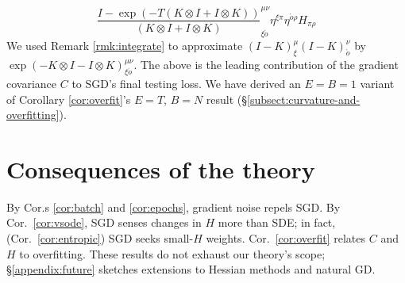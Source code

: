 \documentclass[anon,12pt]{colt2021} %
\newcommand{\wrap}[1]{\left(#1\right)}
\newcommand{\omicron}{{\acute{o}}}
\begin{document}
{$${                        \frac{
                            I-\exp\wrap{-T(K\otimes I + I\otimes K)}
                        }{
                            (K\otimes I + I\otimes K)
                        }
                    }^{\mu\nu}_{\xi\omicron}
                    \eta^{\xi\pi}
                    \eta^{\omicron\rho}
                H_{\pi\rho}
            $$
            We used Remark \ref{rmk:integrate} to approximate
            $(I-K)^\mu_\xi(I-K)^\nu_\omicron$ by $\exp(-K\otimes I - I\otimes K)^{\mu\nu}_{\xi\omicron}$.
            The above is the leading contribution of the gradient covariance $C$
            to SGD's final testing loss.  We have derived an $E=B=1$ variant of
            Corollary \ref{cor:overfit}'s 
            $E=T$, $B=N$ result (\S\ref{subsect:curvature-and-overfitting}).
            \newpage
    \section{Consequences of the theory}\label{sect:consequences}

        By Cor.s \ref{cor:batch} and \ref{cor:epochs}, gradient noise repels SGD.
        By Cor.\ \ref{cor:vsode}, SGD senses changes in $H$ more than
            SDE; in fact, (Cor.\ \ref{cor:entropic}) SGD seeks small-$H$
            weights.
        Cor.\ \ref{cor:overfit} relates
            $C$ and $H$ to overfitting.  These
            results do not exhaust our theory's scope;
            \S\ref{appendix:future} sketches 
            extensions to Hessian methods and natural GD.

}
\end{document}
